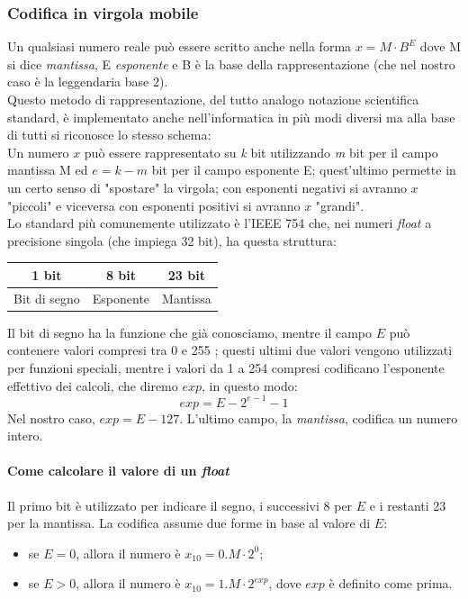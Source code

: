 \subsubsection{Codifica in virgola mobile}
Un qualsiasi numero reale può essere scritto anche nella forma $x=M\cdot B^{E}$ dove M si dice \textit{mantissa}, E \textit{esponente} e B è la base della rappresentazione (che nel nostro caso è la leggendaria base 2).\\
Questo metodo di rappresentazione, del tutto analogo notazione scientifica standard, è implementato anche nell'informatica in più modi diversi ma alla base di tutti si riconosce lo stesso schema: \\
Un numero $x$ può essere rappresentato su \textit{k} bit utilizzando \textit{m} bit per il campo mantissa M ed $e=k-m$ bit per il campo esponente E; quest'ultimo permette in un certo senso di "spostare" la virgola; con esponenti negativi si avranno $x$ "piccoli" e viceversa con esponenti positivi si avranno $x$ "grandi".\\
Lo standard più comunemente utilizzato è l'IEEE 754 che, nei numeri \textit{float} a precisione singola (che impiega 32 bit), ha questa struttura:
\begin{table}[h!]
	\centering
	\begin{tabular}{|l|l|l|}
		\hline
		\multicolumn{1}{|c|}{1 bit} & \multicolumn{1}{c|}{8 bit} & \multicolumn{1}{c|}{23 bit} \\ \hline
		Bit di segno                & Esponente                  & Mantissa                    \\ \hline
	\end{tabular}
\end{table}


Il bit di segno ha la funzione che già conosciamo, mentre il campo $E$ può contenere valori compresi tra 0 e 255%
; questi ultimi due valori vengono utilizzati per funzioni speciali, mentre i valori da 1 a 254 compresi codificano l'esponente effettivo dei calcoli, che diremo $exp$,	 in questo modo: 
\begin{equation*}
exp=E-2^{e-1}-1
\end{equation*}
Nel nostro caso, $exp=E-127$. L'ultimo campo, la \textit{mantissa}, codifica un numero intero. 
\paragraph{Come calcolare il valore di un \textit{float}} Il primo bit è utilizzato per indicare il segno, i successivi 8 per $E$ e i restanti 23 per la mantissa. La codifica assume due forme in base al valore di $E$:
\begin{itemize}[noitemsep,nolistsep]
	\item se $E=0$, allora il numero è $x_{10}=0.M \cdot 2^{0}$;
	\item se $E>0$, allora il numero è $x_{10}=1.M \cdot 2^{exp}$, dove $exp$ è definito come prima.
\end{itemize}